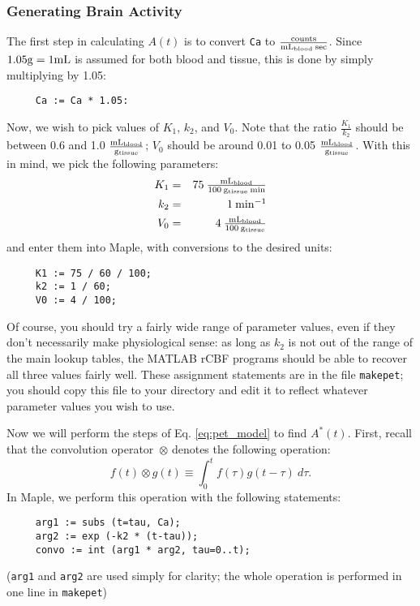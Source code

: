 \documentclass[11pt]{article}
\newcommand{\units}[1]{\mbox{$\rm{#1}$}}
\newcommand{\funits}[2]{\mbox{$\rm\frac{#1}{#2}$}}
\begin{document}
\subsubsection{Generating Brain Activity}

The first step in calculating $A(t)$ is to convert \verb|Ca| to 
\funits{counts}{mL_{blood}\:sec}.  Since $1.05 \units{g} = 1
\units{mL}$ is assumed for both blood and tissue, this is done by
simply multiplying by 1.05:
\begin{verbatim}
     Ca := Ca * 1.05:
\end{verbatim}
Now, we wish to pick values of $K_{1}$, $k_{2}$, and $V_{0}$.  Note
that the ratio $\frac{K_{1}}{k_{2}}$ should be between 0.6
and 1.0 \funits{mL_{blood}}{g_{tissue}}; $V_{0}$ should be around 0.01 to
0.05 \funits{mL_{blood}}{g_{tissue}}.  With this in mind, we pick the
following parameters:
\begin{eqnarray*}
K_{1} &=& 75 \: \funits{mL_{blood}}{100\:g_{tissue}\:{min}} \\
k_{2} &=& 1 \: \units{min^{-1}} \\
V_{0} &=& 4 \: \funits{mL_{blood}}{100\:g_{tissue}}
\end{eqnarray*}
and enter them into Maple, with conversions to the desired units:
\begin{verbatim}
     K1 := 75 / 60 / 100;
     k2 := 1 / 60;
     V0 := 4 / 100;
\end{verbatim}
Of course, you should try a fairly wide range of parameter values,
even if they don't necessarily make physiological sense: as long as
$k_{2}$ is not out of the range of the main lookup tables, the MATLAB
rCBF programs should be able to recover all three values fairly well.
These assignment statements are in the file \verb|makepet|; you should
copy this file to your directory and edit it to reflect whatever
parameter values you wish to use.

Now we will perform the steps of Eq. \ref{eq:pet_model} to find
$A^{*}(t)$.  First, recall that the convolution operator~$\otimes$
denotes the following operation:
\begin{equation}
f(t) \otimes g(t) \equiv \int_{0}^{t} f(\tau) g(t-\tau) \: d\tau.
\label{eq:convolution} 
\end{equation}
In Maple, we perform this operation with the following statements:
\begin{verbatim}
     arg1 := subs (t=tau, Ca);
     arg2 := exp (-k2 * (t-tau));
     convo := int (arg1 * arg2, tau=0..t);
\end{verbatim}
(\verb|arg1| and \verb|arg2| are used simply for clarity; the whole
operation is performed in one line in \verb|makepet|)
\end{document}
